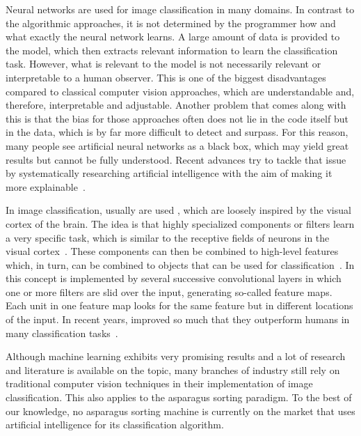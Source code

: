 \bigskip
Neural networks are used for image classification in many domains. In contrast to the algorithmic approaches, it is not determined by the programmer how and what exactly the neural network learns. A large amount of data is provided to the model, which then extracts relevant information to learn the classification task. However, what is relevant to the model is not necessarily relevant or interpretable to a human observer. This is one of the biggest disadvantages compared to classical computer vision approaches, which are understandable and, therefore, interpretable and adjustable. Another problem that comes along with this is that the bias for those approaches often does not lie in the code itself but in the data, which is by far more difficult to detect and surpass. For this reason, many people see artificial neural networks as a black box, which may yield great results but cannot be fully understood. Recent advances try to tackle that issue by systematically researching artificial intelligence with the aim of making it more explainable~\citep{tjoa2019survey,gilpin2018explaining}.

In image classification, usually  are used \citep{geron2019hands,lecun1995convolutional}, which are loosely inspired by the visual cortex of the brain. The idea is that highly specialized components or filters learn a very specific task, which is similar to the receptive fields of neurons in the visual cortex~\citep{hubel1962receptive}. These components can then be combined to high-level features which, in turn, can be combined to objects that can be used for classification~\citep{geron2019hands,bishop2006pattern,lecun1995convolutional}. In  this concept is implemented by several successive convolutional layers in which one or more filters are slid over the input, generating so-called feature maps. Each unit in one feature map looks for the same feature but in different locations of the input. In recent years,  improved so much that they outperform humans in many classification tasks~\citep{russakovsky2015imagenet,KarpathyConvNet}.

\bigskip
Although machine learning exhibits very promising results and a lot of research and literature is available on the topic, many branches of industry still rely on traditional computer vision techniques in their implementation of image classification. This also applies to the asparagus sorting paradigm. To the best of our knowledge, no asparagus sorting machine is currently on the market that uses artificial intelligence for its classification algorithm.

